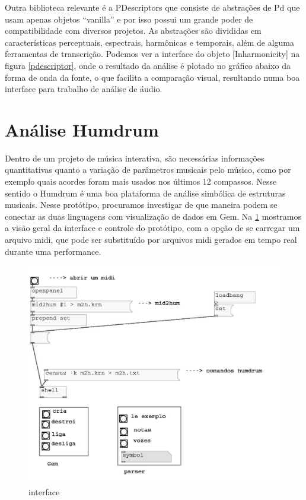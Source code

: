 \documentclass{ppgmus}
\begin{document}
Outra  biblioteca relevante é a PDescriptors \cite{monteiro} que consiste
de abstrações de Pd que usam apenas objetos ``vanilla'' e por isso possui um
grande poder de compatibilidade com diversos projetos. As abstrações
são divididas em características perceptuais, espectrais, harmônicas e temporais, além
de alguma ferramentas de transcrição. Podemos ver a interface do objeto [Inharmonicity\texttildelow]
na figura \ref{pdescriptor}, onde o resultado da análise é plotado no gráfico abaixo da forma de 
onda da fonte, o que facilita a comparação visual, resultando numa boa interface para trabalho de análise de áudio.



\pagebreak 



\section{Análise Humdrum}

  Dentro de um projeto de música interativa, são necessárias informações quantitativas quanto a 
variação de parâmetros musicais pelo músico, como por exemplo quais acordes foram mais usados 
nos últimos 12 compassos.
Nesse sentido o Humdrum é uma boa plataforma de análise simbólica de estruturas musicais. 
Nesse protótipo, procuramos investigar de que maneira podem se conectar as duas linguagens 
com visualização de dados em Gem.
Na \ref{interface} mostramos a visão geral da interface e controle
do protótipo, com a opção de se carregar um arquivo midi, 
que pode ser substituído por arquivos midi gerados em tempo real 
durante uma performance.




\begin{figure}
\includegraphics[scale=.7]{interface00}
\caption{interface}
\label{interface}
\end{figure} 
\end{document}
